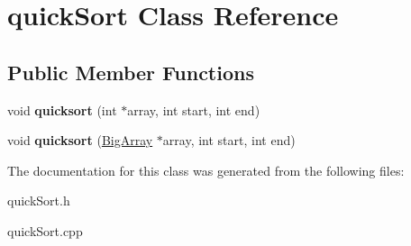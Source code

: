 \hypertarget{classquick_sort}{}\section{quick\+Sort Class Reference}
\label{classquick_sort}
\subsection*{Public Member Functions}
\begin{DoxyCompactItemize}
\item 
\mbox{\label{classquick_sort_afb2b94d61c8b533973ccb308d14d3159}} 
void {\bfseries quicksort} (int $\ast$array, int start, int end)
\item 
\mbox{\label{classquick_sort_a340903fb109191ca15c5b1239a030d26}} 
void {\bfseries quicksort} (\hyperlink{class_big_array}{Big\+Array} $\ast$array, int start, int end)
\end{DoxyCompactItemize}


The documentation for this class was generated from the following files\+:\begin{DoxyCompactItemize}
\item 
quick\+Sort.\+h\item 
quick\+Sort.\+cpp\end{DoxyCompactItemize}
